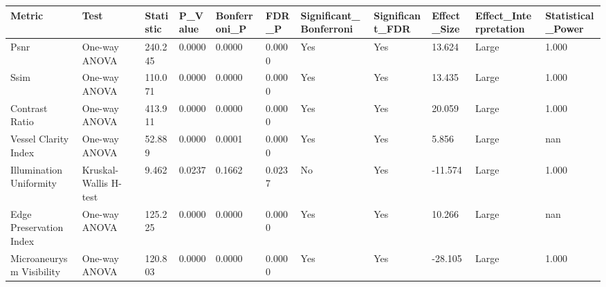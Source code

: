 \begin{tabular}{lllllllllll}
\toprule
Metric & Test & Statistic & P_Value & Bonferroni_P & FDR_P & Significant_Bonferroni & Significant_FDR & Effect_Size & Effect_Interpretation & Statistical_Power \\
\midrule
Psnr & One-way ANOVA & 240.245 & 0.0000 & 0.0000 & 0.0000 & Yes & Yes & 13.624 & Large & 1.000 \\
Ssim & One-way ANOVA & 110.071 & 0.0000 & 0.0000 & 0.0000 & Yes & Yes & 13.435 & Large & 1.000 \\
Contrast Ratio & One-way ANOVA & 413.911 & 0.0000 & 0.0000 & 0.0000 & Yes & Yes & 20.059 & Large & 1.000 \\
Vessel Clarity Index & One-way ANOVA & 52.889 & 0.0000 & 0.0001 & 0.0000 & Yes & Yes & 5.856 & Large & nan \\
Illumination Uniformity & Kruskal-Wallis H-test & 9.462 & 0.0237 & 0.1662 & 0.0237 & No & Yes & -11.574 & Large & 1.000 \\
Edge Preservation Index & One-way ANOVA & 125.225 & 0.0000 & 0.0000 & 0.0000 & Yes & Yes & 10.266 & Large & nan \\
Microaneurysm Visibility & One-way ANOVA & 120.803 & 0.0000 & 0.0000 & 0.0000 & Yes & Yes & -28.105 & Large & 1.000 \\
\bottomrule
\end{tabular}
